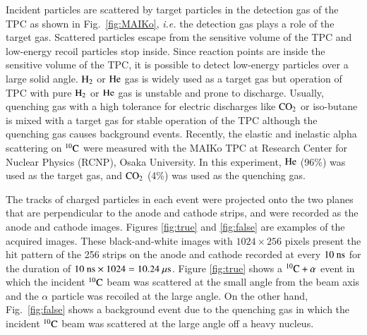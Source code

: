 \documentclass{jps-cp}
\begin{document}
Incident particles are scattered by target particles in the detection gas of the TPC as shown in Fig.~\ref{fig:MAIKo}, {\it i.e.} the detection gas plays a role of the target gas.
Scattered particles escape from the sensitive volume of the TPC and low-energy recoil particles stop inside.
Since reaction points are inside the sensitive volume of the TPC,
it is possible to detect low-energy particles over a large solid angle.
$\rm{H}_{2}$ or $\rm{He}$ gas is widely used as a target gas
but operation of TPC with pure $\rm{H}_{2}$ or $\rm{He}$ gas is unstable and prone to discharge.
Usually, quenching gas with a high tolerance for electric discharges
like $\rm{CO}_{2}$ or iso-butane is mixed with a target gas
for stable operation of the TPC although the quenching gas causes background events.
Recently, the elastic and inelastic alpha scattering on ${}^{10}\rm{C}$ were measured with the MAIKo TPC
at Research Center for Nuclear Physics (RCNP), Osaka University.
In this experiment, $\rm{He}$ (96\%) was used as the target gas, and $\rm{CO}_{2}$ (4\%) was used as the quenching gas.

The tracks of charged particles in each event were projected onto the two planes that are perpendicular to the anode and cathode strips, and were recorded as the anode and cathode images.
Figures \ref{fig:true} and \ref{fig:false} are examples of the acquired images.
These black-and-white images with $1024\times 256$ pixels present the hit pattern of the 256 strips on the anode and cathode recorded
at every $10~\rm{ns}$ for the duration of $10~\rm{ns}\times 1024 = 10.24~\rm{\mu s}$.
Figure \ref{fig:true} shows a ${}^{10}\rm{C}+\alpha$ event
in which the incident ${}^{10}\rm{C}$ beam was scattered at the small angle from the beam axis and the $\alpha$ particle was
recoiled at the large angle.
On the other hand, Fig.~\ref{fig:false} shows a background event due to the quenching gas
in which the incident ${}^{10}\rm{C}$ beam was scattered at the large angle off a heavy nucleus.
\end{document}
